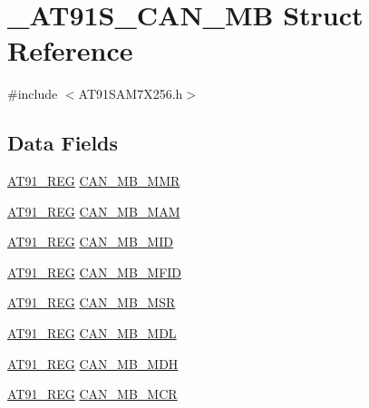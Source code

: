\hypertarget{struct__AT91S__CAN__MB}{\section{\-\_\-\-A\-T91\-S\-\_\-\-C\-A\-N\-\_\-\-M\-B Struct Reference}
\label{struct__AT91S__CAN__MB}
}


{\ttfamily \#include $<$A\-T91\-S\-A\-M7\-X256.\-h$>$}

\subsection*{Data Fields}
\begin{DoxyCompactItemize}
\item 
\hyperlink{GCC_2ARM7__AT91SAM7S_2AT91SAM7X256_8h_a712ad5a1ac1bd02f3e95a7526c283ce1}{A\-T91\-\_\-\-R\-E\-G} \hyperlink{struct__AT91S__CAN__MB_a54268787d609f70861f4311b63836033}{C\-A\-N\-\_\-\-M\-B\-\_\-\-M\-M\-R}
\item 
\hyperlink{GCC_2ARM7__AT91SAM7S_2AT91SAM7X256_8h_a712ad5a1ac1bd02f3e95a7526c283ce1}{A\-T91\-\_\-\-R\-E\-G} \hyperlink{struct__AT91S__CAN__MB_a88174644fd6cf4e176034b1fe7d8d16c}{C\-A\-N\-\_\-\-M\-B\-\_\-\-M\-A\-M}
\item 
\hyperlink{GCC_2ARM7__AT91SAM7S_2AT91SAM7X256_8h_a712ad5a1ac1bd02f3e95a7526c283ce1}{A\-T91\-\_\-\-R\-E\-G} \hyperlink{struct__AT91S__CAN__MB_a21efa474a69196f0df94ff6714e9feb3}{C\-A\-N\-\_\-\-M\-B\-\_\-\-M\-I\-D}
\item 
\hyperlink{GCC_2ARM7__AT91SAM7S_2AT91SAM7X256_8h_a712ad5a1ac1bd02f3e95a7526c283ce1}{A\-T91\-\_\-\-R\-E\-G} \hyperlink{struct__AT91S__CAN__MB_a2634668d962e7669f44f042e420ff4d7}{C\-A\-N\-\_\-\-M\-B\-\_\-\-M\-F\-I\-D}
\item 
\hyperlink{GCC_2ARM7__AT91SAM7S_2AT91SAM7X256_8h_a712ad5a1ac1bd02f3e95a7526c283ce1}{A\-T91\-\_\-\-R\-E\-G} \hyperlink{struct__AT91S__CAN__MB_ac0b6e12f73a44773934bb212117ca2b7}{C\-A\-N\-\_\-\-M\-B\-\_\-\-M\-S\-R}
\item 
\hyperlink{GCC_2ARM7__AT91SAM7S_2AT91SAM7X256_8h_a712ad5a1ac1bd02f3e95a7526c283ce1}{A\-T91\-\_\-\-R\-E\-G} \hyperlink{struct__AT91S__CAN__MB_abfd3dd6c614553af6371be7018ebb091}{C\-A\-N\-\_\-\-M\-B\-\_\-\-M\-D\-L}
\item 
\hyperlink{GCC_2ARM7__AT91SAM7S_2AT91SAM7X256_8h_a712ad5a1ac1bd02f3e95a7526c283ce1}{A\-T91\-\_\-\-R\-E\-G} \hyperlink{struct__AT91S__CAN__MB_a7d39aa4dea8601f47177334d7083332e}{C\-A\-N\-\_\-\-M\-B\-\_\-\-M\-D\-H}
\item 
\hyperlink{GCC_2ARM7__AT91SAM7S_2AT91SAM7X256_8h_a712ad5a1ac1bd02f3e95a7526c283ce1}{A\-T91\-\_\-\-R\-E\-G} \hyperlink{struct__AT91S__CAN__MB_af51897a132563a5f01cbeef42467bab2}{C\-A\-N\-\_\-\-M\-B\-\_\-\-M\-C\-R}
\end{DoxyCompactItemize}


